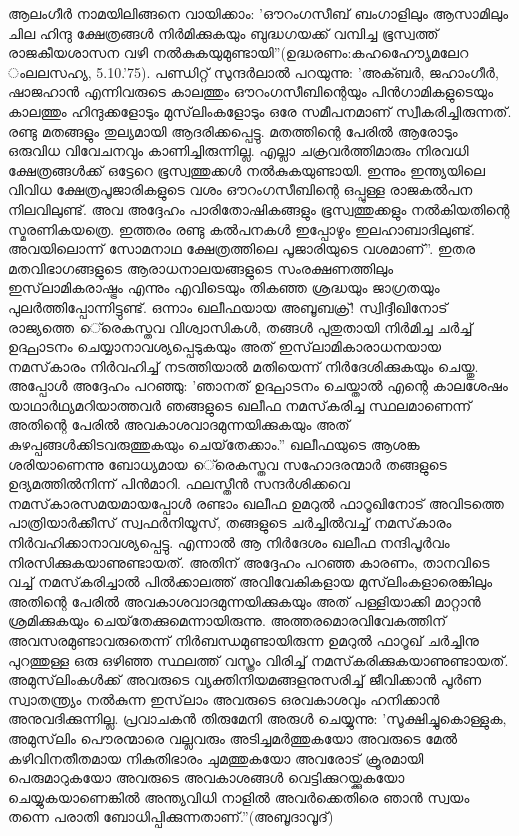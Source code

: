 ആലംഗീര്‍ നാമയിലിങ്ങനെ വായിക്കാം: 'ഔറംഗസീബ് ബംഗാളിലും ആസാമിലും ചില ഹിന്ദു ക്ഷേത്രങ്ങള്‍ നിര്‍മിക്കുകയും ബുദ്ധഗയക്ക് വമ്പിച്ച ഭൂസ്വത്ത് രാജകീയശാസന വഴി നല്‍കുകയുമുണ്ടായി''(ഉദ്ധരണം:കഹഹൗേെൃമലേറ ംലലസഹ്യ, 5.10.'75).
പണ്ഡിറ്റ് സുന്ദര്‍ലാല്‍ പറയുന്നു: 'അക്ബര്‍, ജഹാംഗീര്‍, ഷാജഹാന്‍ എന്നിവരുടെ കാലത്തും ഔറംഗസീബിന്റെയും പിന്‍ഗാമികളുടെയും കാലത്തും ഹിന്ദുക്കളോടും മുസ്‌ലിംകളോടും ഒരേ സമീപനമാണ് സ്വീകരിച്ചിരുന്നത്. രണ്ടു മതങ്ങളും തുല്യമായി ആദരിക്കപ്പെട്ടു. മതത്തിന്റെ പേരില്‍ ആരോടും ഒരുവിധ വിവേചനവും കാണിച്ചിരുന്നില്ല. എല്ലാ ചക്രവര്‍ത്തിമാരും നിരവധി ക്ഷേത്രങ്ങള്‍ക്ക് ഒട്ടേറെ ഭൂസ്വത്തുക്കള്‍ നല്‍കുകയുണ്ടായി. ഇന്നും ഇന്ത്യയിലെ വിവിധ ക്ഷേത്രപൂജാരികളുടെ വശം ഔറംഗസീബിന്റെ ഒപ്പുള്ള രാജകല്‍പന നിലവിലുണ്ട്. അവ അദ്ദേഹം പാരിതോഷികങ്ങളും ഭൂസ്വത്തുക്കളും നല്‍കിയതിന്റെ സ്മരണികയത്രെ. ഇത്തരം രണ്ടു കല്‍പനകള്‍ ഇപ്പോഴും ഇലഹാബാദിലുണ്ട്. അവയിലൊന്ന് സോമനാഥ ക്ഷേത്രത്തിലെ പൂജാരിയുടെ വശമാണ്''.
ഇതര മതവിഭാഗങ്ങളുടെ ആരാധനാലയങ്ങളുടെ സംരക്ഷണത്തിലും ഇസ്‌ലാമികരാഷ്ട്രം എന്നും എവിടെയും തികഞ്ഞ ശ്രദ്ധയും ജാഗ്രതയും പുലര്‍ത്തിപ്പോന്നിട്ടുണ്ട്. ഒന്നാം ഖലീഫയായ അബൂബക്ര്! സ്വിദ്ദീഖിനോട് രാജ്യത്തെ െ്രെകസ്തവ വിശ്വാസികള്‍, തങ്ങള്‍ പുതുതായി നിര്‍മിച്ച ചര്‍ച്ച് ഉദ്ഘാടനം ചെയ്യാനാവശ്യപ്പെടുകയും അത് ഇസ്‌ലാമികാരാധനയായ നമസ്‌കാരം നിര്‍വഹിച്ച് നടത്തിയാല്‍ മതിയെന്ന് നിര്‍ദേശിക്കുകയും ചെയ്തു. അപ്പോള്‍ അദ്ദേഹം പറഞ്ഞു: 'ഞാനത് ഉദ്ഘാടനം ചെയ്താല്‍ എന്റെ കാലശേഷം യാഥാര്‍ഥ്യമറിയാത്തവര്‍ ഞങ്ങളുടെ ഖലീഫ നമസ്‌കരിച്ച സ്ഥലമാണെന്ന് അതിന്റെ പേരില്‍ അവകാശവാദമുന്നയിക്കുകയും അത് കുഴപ്പങ്ങള്‍ക്കിടവരുത്തുകയും ചെയ്‌തേക്കാം.'' ഖലീഫയുടെ ആശങ്ക ശരിയാണെന്നു ബോധ്യമായ െ്രെകസ്തവ സഹോദരന്മാര്‍ തങ്ങളുടെ ഉദ്യമത്തില്‍നിന്ന് പിന്‍മാറി.
ഫലസ്തീന്‍ സന്ദര്‍ശിക്കവെ നമസ്‌കാരസമയമായപ്പോള്‍ രണ്ടാം ഖലീഫ ഉമറുല്‍ ഫാറൂഖിനോട് അവിടത്തെ പാത്രിയാര്‍ക്കീസ് സ്വഫര്‍നിയൂസ്, തങ്ങളുടെ ചര്‍ച്ചില്‍വച്ച് നമസ്‌കാരം നിര്‍വഹിക്കാനാവശ്യപ്പെട്ടു. എന്നാല്‍ ആ നിര്‍ദേശം ഖലീഫ നന്ദിപൂര്‍വം നിരസിക്കുകയാണുണ്ടായത്. അതിന് അദ്ദേഹം പറഞ്ഞ കാരണം, താനവിടെ വച്ച് നമസ്‌കരിച്ചാല്‍ പില്‍ക്കാലത്ത് അവിവേകികളായ മുസ്‌ലിംകളാരെങ്കിലും അതിന്റെ പേരില്‍ അവകാശവാദമുന്നയിക്കുകയും അത് പള്ളിയാക്കി മാറ്റാന്‍ ശ്രമിക്കുകയും ചെയ്‌തേക്കുമെന്നായിരുന്നു. അത്തരമൊരവിവേകത്തിന് അവസരമുണ്ടാവരുതെന്ന് നിര്‍ബന്ധമുണ്ടായിരുന്ന ഉമറുല്‍ ഫാറൂഖ് ചര്‍ച്ചിനു പുറത്തുള്ള ഒരു ഒഴിഞ്ഞ സ്ഥലത്ത് വസ്ത്രം വിരിച്ച് നമസ്‌കരിക്കുകയാണുണ്ടായത്.
അമുസ്‌ലിംകള്‍ക്ക് അവരുടെ വ്യക്തിനിയമങ്ങളനുസരിച്ച് ജീവിക്കാന്‍ പൂര്‍ണ സ്വാതന്ത്യ്രം നല്‍കുന്ന ഇസ്‌ലാം അവരുടെ ഒരവകാശവും ഹനിക്കാന്‍ അനുവദിക്കുന്നില്ല. പ്രവാചകന്‍ തിരുമേനി അരുള്‍ ചെയ്യുന്നു: 'സൂക്ഷിച്ചുകൊള്ളുക, അമുസ്‌ലിം പൌരന്മാരെ വല്ലവരും അടിച്ചമര്‍ത്തുകയോ അവരുടെ മേല്‍ കഴിവിനതീതമായ നികുതിഭാരം ചുമത്തുകയോ അവരോട് ക്രൂരമായി പെരുമാറുകയോ അവരുടെ അവകാശങ്ങള്‍ വെട്ടിക്കുറയ്ക്കുകയോ ചെയ്യുകയാണെങ്കില്‍ അന്ത്യവിധി നാളില്‍ അവര്‍ക്കെതിരെ ഞാന്‍ സ്വയം തന്നെ പരാതി ബോധിപ്പിക്കുന്നതാണ്.''(അബൂദാവൂദ്)
